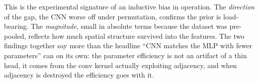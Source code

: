 This is the experimental signature of an inductive bias in operation. The
\emph{direction} of the gap, the CNN worse off under permutation, confirms the
prior is load-bearing. The \emph{magnitude}, small in absolute terms because
the dataset was pre-pooled, reflects how much spatial structure survived into
the features. The two findings together say more than the headline ``CNN
matches the MLP with fewer parameters'' can on its own: the parameter
efficiency is not an artifact of a thin head, it comes from the conv kernel
actually exploiting adjacency, and when adjacency is destroyed the efficiency
goes with it.
